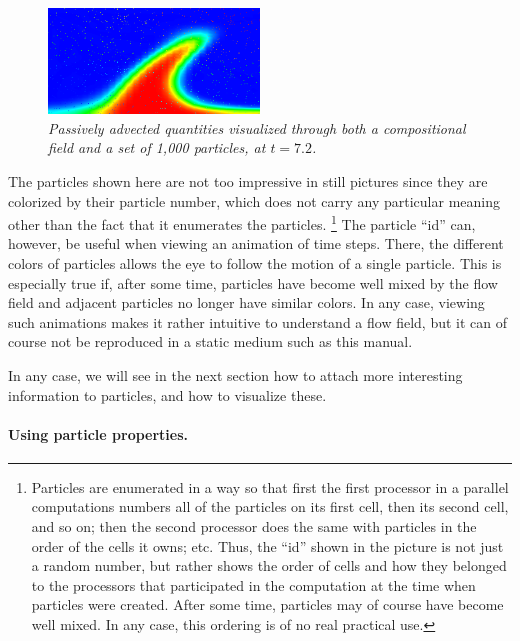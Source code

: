 \documentclass{article}
\begin{document}
\begin{figure}
  \centering
  \includegraphics[width=0.5\textwidth]{cookbooks/composition-passive-particles/solution-00072.png}
  \caption{\it Passively advected quantities visualized through both a
  compositional field and a set of 1,000 particles, at $t=7.2$.}
  \label{fig:composition-passive-particles}
\end{figure}

The particles shown here are not too impressive in still pictures since they are
colorized by their particle number, which does not carry any particular meaning
other than the fact that it enumerates the particles.%
\footnote{Particles are enumerated in a way so that first the first processor
in a parallel computations numbers all of the particles on its first cell, then
its second cell, and so on; then the second processor does the same with
particles in the order of the cells it owns; etc. Thus, the ``id'' shown in the
picture is not just a random number, but rather shows the order of cells and
how they belonged to the processors that participated in the computation at the
time when particles were created. After some time, particles may of course have
become well mixed. In any case, this ordering is of no real practical use.} 
The particle ``id'' can, however, be useful when viewing an animation of time steps.
There, the different colors of particles allows the eye to follow the motion of
a single particle. This is especially true if, after some time, particles have
become well mixed by the flow field and adjacent particles no longer have
similar colors. In any case, viewing such animations makes it rather intuitive
to understand a flow field, but it can of course not be reproduced in a static medium such as this manual.

In any case, we will see in the next section how to attach more interesting
information to particles, and how to visualize these.


\paragraph{Using particle properties.}
\end{document}
